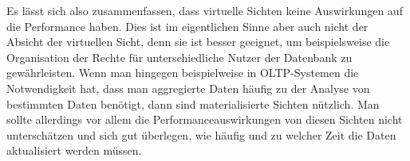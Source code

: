 Es lässt sich also zusammenfassen, dass virtuelle Sichten keine Auswirkungen auf die Performance haben.
Dies ist im eigentlichen Sinne aber auch nicht der Absicht der virtuellen Sicht, denn sie ist besser geeignet, um beispielsweise die Organisation der Rechte für unterschiedliche Nutzer der Datenbank zu gewährleisten.
Wenn man hingegen beispielweise in OLTP-Systemen die Notwendigkeit hat, dass man aggregierte Daten häufig zu der Analyse von bestimmten Daten benötigt, dann sind materialisierte Sichten nützlich.
Man sollte allerdings vor allem die Performanceauswirkungen von diesen Sichten nicht unterschätzen und sich gut überlegen, wie häufig und zu welcher Zeit die Daten aktualisiert werden müssen.